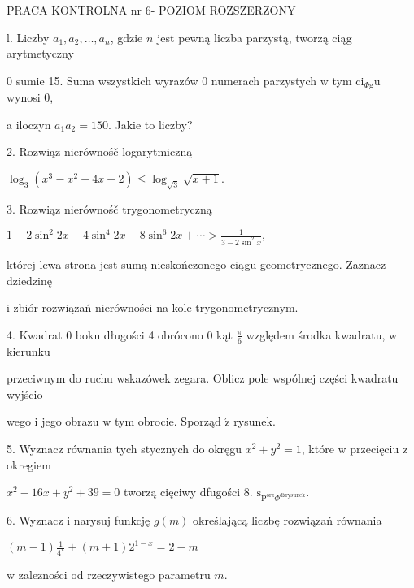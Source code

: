 \documentclass[a4paper,12pt]{article}
\begin{document}
PRACA KONTROLNA nr 6- POZIOM ROZSZERZONY

l. Liczby $a_{1}, a_{2}, \ldots, a_{n}$, gdzie $n$ jest pewną liczba parzystą, tworzą ciąg arytmetyczny

$0$ sumie 15. Suma wszystkich wyrazów $0$ numerach parzystych $\mathrm{w}$ tym $\mathrm{c}\mathrm{i}_{\Phi \mathrm{g}}\mathrm{u}$ wynosi 0,

a iloczyn $a_{1}a_{2}=150$. Jakie to liczby?

2. Rozwiąz nierównośč logarytmiczną

$\log_{3}(x^{3}-x^{2}-4x-2)\leq\log_{\sqrt{3}}\sqrt{x+1}.$

3. Rozwiąz nierównośč trygonometryczną

$1-2\displaystyle \sin^{2}2x+4\sin^{4}2x-8\sin^{6}2x+\cdots>\frac{1}{3-2\sin^{2}x},$

której lewa strona jest sumą nieskończonego ciągu geometrycznego. Zaznacz dziedzinę

$\mathrm{i}$ zbiór rozwiązań nierówności na kole trygonometrycznym.

4. Kwadrat $0$ boku długości 4 obrócono $0$ kąt $\displaystyle \frac{\pi}{6}$ względem środka kwadratu, $\mathrm{w}$ kierunku

przeciwnym do ruchu wskazówek zegara. Oblicz pole wspólnej części kwadratu wyjścio-

wego $\mathrm{i}$ jego obrazu $\mathrm{w}$ tym obrocie. Sporząd $\acute{\mathrm{z}}$ rysunek.

5. Wyznacz równania tych stycznych do okręgu $x^{2}+y^{2}=1$, które $\mathrm{w}$ przecięciu $\mathrm{z}$ okregiem

$x^{2}-16x+y^{2}+39=0$ tworzą cięciwy dfugości 8. $\mathrm{s}_{\mathrm{P}^{\mathrm{o}\mathrm{r}\mathrm{z}}\Phi^{\mathrm{d}\acute{\mathrm{z}}\mathrm{r}\mathrm{y}\mathrm{s}\mathrm{u}\mathrm{n}\mathrm{e}\mathrm{k}}}.$

6. Wyznacz $\mathrm{i}$ narysuj funkcję $g(m)$ określającą liczbę rozwiązań równania

$(m-1)\displaystyle \frac{1}{4^{x}}+(m+1)2^{1-x}=2-m$

$\mathrm{w}$ zalezności od rzeczywistego parametru $m.$
\end{document}
